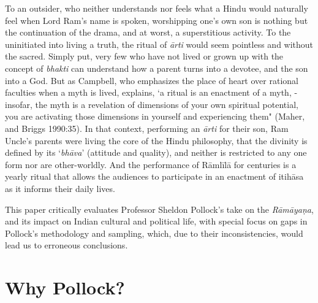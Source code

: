 To an outsider, who neither understands nor feels what a Hindu would naturally feel when Lord Ram’s name is spoken, worshipping one's own son is nothing but the continuation of the drama, and at worst, a superstitious activity. To the uninitiated into living a truth, the ritual of \textit{ārti} would seem pointless and without the sacred. Simply put, very few who have not lived or grown up with the concept of \textit{bhakti} can understand how a parent turns into a devotee, and the son into a God. But as Campbell, who emphasizes the place of heart over rational faculties when a myth is lived, explains, ‘a ritual is an enactment of a myth, - insofar, the myth is a revelation of dimensions of your own spiritual potential, you are activating those dimensions in yourself and experiencing them" (Maher, and Briggs 1990:35). In that context, performing an \textit{ārti} for their son, Ram Uncle’s parents were living the core of the Hindu philosophy, that the divinity is defined by its ‘\textit{bhāva}’ (attitude and quality), and neither is restricted to any one form nor are other-worldly. And the performance of Rāmlīlā for centuries is a yearly ritual that allows the audiences to participate in an enactment of itihāsa as it informs their daily lives.

This paper critically evaluates Professor Sheldon Pollock’s take on the \textit{Rāmāyaṇa}, and its impact on Indian cultural and political life, with special focus on gaps in Pollock’s methodology and sampling, which, due to their inconsistencies, would lead us to erroneous conclusions.


\section*{Why Pollock?}


